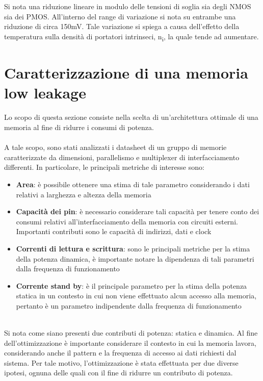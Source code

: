 \documentclass[11pt,  english, makeidx, a4paper, titlepage, oneside]{book}
\begin{document}
\\\\
Si nota una riduzione lineare in modulo delle tensioni di soglia sia degli NMOS sia dei PMOS. All'interno del range di variazione si nota su entrambe una riduzione di circa 150mV. Tale variazione si spiega a causa dell'effetto della temperatura sulla densità di portatori intrinseci, n\textsubscript{i}, la quale tende ad aumentare.
\newpage
\section{Caratterizzazione di una memoria low leakage}
Lo scopo di questa sezione consiste nella scelta di un'architettura ottimale di una memoria al fine di ridurre i consumi di potenza.
\\\\
A tale scopo, sono stati analizzati i datasheet di un gruppo di memorie caratterizzate da dimensioni, parallelismo e multiplexer di interfacciamento differenti. In particolare, le principali metriche di interesse sono:
\begin{itemize}
\item \textbf{Area}: è possibile ottenere una stima di tale parametro considerando i dati relativi a larghezza e altezza della memoria\\
\item \textbf{Capacità dei pin}: è necessario considerare tali capacità per tenere conto dei consumi relativi all'interfacciamento della memoria con circuiti esterni. Importanti contributi sono le capacità di indirizzi, dati e clock\\
\item \textbf{Correnti di lettura e scrittura}: sono le principali metriche per la stima della potenza dinamica, è importante notare la dipendenza di tali parametri dalla frequenza di funzionamento\\
\item \textbf{Corrente stand by}: è il principale parametro per la stima della potenza statica in un contesto in cui non viene effettuato alcun accesso alla memoria, pertanto è un parametro indipendente dalla frequenza di funzionamento\\\\
\end{itemize}
Si nota come siano presenti due contributi di potenza: statica e dinamica. Al fine dell'ottimizzazione è importante considerare il contesto in cui la memoria lavora, considerando anche il pattern e la frequenza di accesso ai dati richiesti dal sistema. Per tale motivo, l'ottimizzazione è stata effettuata per due diverse ipotesi, ognuna delle quali con il fine di ridurre un contributo di potenza.
\end{document}
